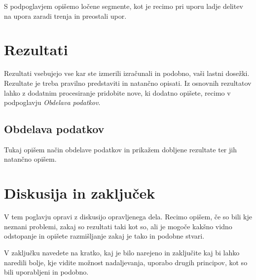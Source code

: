 \documentclass[pomnav, tisk]{fppreport}
\begin{document}
S podpoglavjem opišemo ločene segmente, kot je recimo pri uporu ladje delitev na upora zaradi trenja in preostali upor. 


\newpage
\section{Rezultati}
\label{sec:Rezultati}

Rezultati vsebujejo vse kar ste izmerili izračunali in podobno, vaši lastni dosežki. Rezultate je treba pravilno predstaviti in natančno opisati. Iz osnovnih rezultatov lahko z dodatnim procesiranje pridobite nove, ki dodatno opišete, recimo v podpoglavju \textit{Obdelava podatkov}.

\subsection{Obdelava podatkov}

Tukaj opišem način obdelave podatkov in prikažem dobljene rezultate ter jih natančno opišem.


\newpage
\section{Diskusija in zaključek}
\label{sec:Diskusija}

V tem poglavju opravi z diskusijo opravljenega dela. Recimo opišem, če so bili kje neznani problemi, zakaj so rezultati taki kot so, ali je mogoče kakšno vidno odstopanje in opišete razmišljanje zakaj je tako in podobne stvari.

V zaključku navedete na kratko, kaj je bilo narejeno in zaključite kaj bi lahko naredili bolje, kje vidite možnost nadaljevanja, uporabo drugih principov, kot so bili uporabljeni in podobno.



\cleardoublepage
\singlespacing
{}
\printbibliography
\end{document}
